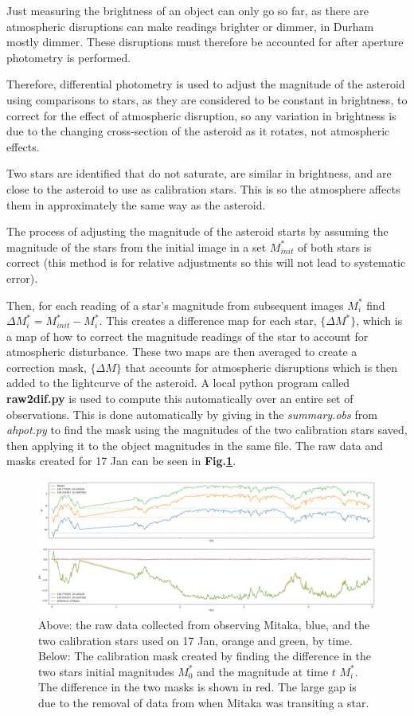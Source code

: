 \documentclass[10pt,twocolumn]{revtex4}    %
\newcommand{\reffig}[1]{\textbf{Fig.#1}}
\begin{document}
Just measuring the brightness of an object can only go so far, as there are atmospheric disruptions can make readings brighter or dimmer, in Durham mostly dimmer. These disruptions must therefore be accounted for after aperture photometry is performed. 

Therefore, differential photometry is used to adjust the magnitude of the asteroid using comparisons to stars, as they are considered to be constant in brightness, to correct for the effect of atmospheric disruption, so any variation in brightness is due to the changing cross-section of the asteroid as it rotates, not atmospheric effects. 

Two stars are identified that do not saturate, are similar in brightness, and are close to the asteroid to use as calibration stars. This is so the atmosphere affects them in approximately the same way as the asteroid.

The process of adjusting the magnitude of the asteroid starts by assuming the magnitude of the stars from the initial image in a set $M_{init}^*$ of both stars is correct (this method is for relative adjustments so this will not lead to systematic error).

Then, for each reading of a star's magnitude from subsequent images $M_i^*$ find $\Delta M_i^* = M_{init}^* - M_i^*$. This creates a difference map for each star, $\{\Delta M^*\}$, which is a map of how to correct the magnitude readings of the star to account for atmospheric disturbance. These two maps are then averaged to create a correction mask, $\{\Delta M\}$ that accounts for atmospheric disruptions which is then added to the lightcurve of the asteroid.  
A local python program called \textbf{raw2dif.py} is used to compute this automatically over an entire set of observations. This is done automatically by giving in the \textit{summary.obs} from \textit{ahpot.py} to find the mask using the magnitudes of the two calibration stars saved, then applying it to the object magnitudes in the same file. The raw data and masks created for 17 Jan can be seen in \reffig{\ref{fig:mask}}.

\begin{figure}
    \centering
    \includegraphics[width = \textwidth]{CalibrationMask.png}
    \caption{Above: the raw data collected from observing Mitaka, blue, and the two calibration stars used on 17 Jan, orange and green, by time. Below: The calibration mask created by finding the difference in the two stars initial magnitudes $M_0^*$ and the magnitude at time $t$ $M_i^*$. The difference in the two masks is shown in red. The large gap is due to the removal of data from when Mitaka was transiting a star.}
    \label{fig:mask}
\end{figure}
\end{document}
